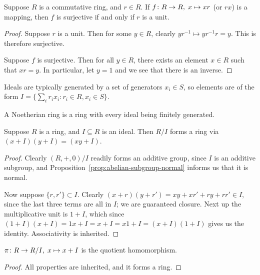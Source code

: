 \begin{lemma}
    Suppose \(R\) is a commutative ring, and \(r \in R\).
    If \(f\colon R\to R,\;x\mapsto xr\) (or \(rx\)) is a mapping,
    then \(f\) is surjective if and only if \(r\) is a unit.
\end{lemma}
\begin{proof}
    Suppose \(r\) is a unit.
    Then for some \(y \in R\),
    clearly \(yr^{-1} \mapsto yr^{-1}r = y\).
    This is therefore surjective.

    Suppose \(f\) is surjective.
    Then for all \(y \in R\),
    there exists an element \(x \in R\) such that \(xr = y\).
    In particular, let \(y = 1\) and we see that there is an inverse.
\end{proof}
\begin{remark}
    Ideals are typically generated by a set of generators \(x_i \in S\),
    so elements are of the form
    \(I = \{\sum_i r_i x_i : r_i \in R, x_i \in S\}\).
\end{remark}
\begin{definition}
    A Noetherian ring is a ring with every ideal being finitely generated.
\end{definition}

\begin{lemma}
    Suppose \(R\) is a ring, and \(I \subseteq R\) is an ideal.
    Then \(R/I\) forms a ring via \((x+I)(y+I) = (xy+I)\).
\end{lemma}
\begin{proof}
    Clearly \((R,+,0)/I\) readily forms an additive group,
    since \(I\) is an additive subgroup,
    and Proposition~\ref{prop:abelian-subgroup-normal}
    informs us that it is normal.

    Now suppose \(\{r,r'\} \subset I\).
    Clearly \((x+r)(y+r') = xy + xr' + ry + rr' \in I\),
    since the last three terms are all in \(I\);
    we are guaranteed closure.
    Next up the multiplicative unit is \(1+I\),
    which since \((1+I)(x+I) = 1x+I = x+I = x1+I = (x+I)(1+I)\)
    gives us the identity.
    Associativity is inherited.
\end{proof}
\begin{corollary}
    \(\pi\colon R\to R/I,\;x\mapsto x+I\) is the quotient homomorphism.
\end{corollary}
\begin{proof}
    All properties are inherited, and it forms a ring.
\end{proof}

